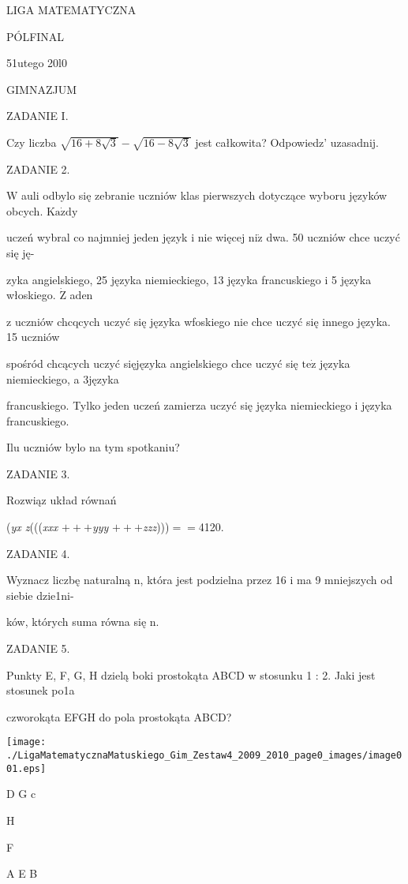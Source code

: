 \documentclass[a4paper,12pt]{article}
\begin{document}
LIGA MATEMATYCZNA

PÓLFINAL

51utego 20l0

GIMNAZJUM

ZADANIE I.

Czy liczba $\sqrt{16+8\sqrt{3}}-\sqrt{16-8\sqrt{3}}$ jest całkowita? Odpowiedz' uzasadnij.

ZADANIE 2.

$\mathrm{W}$ auli odbylo się zebranie uczniów klas pierwszych dotyczące wyboru języków obcych. $\mathrm{K}\mathrm{a}\dot{\mathrm{z}}\mathrm{d}\mathrm{y}$

uczeń wybral co najmniej jeden język i nie więcej $\mathrm{n}\mathrm{i}\dot{\mathrm{z}}$ dwa. 50 uczniów chce uczyć się ję-

zyka angielskiego, 25 języka niemieckiego, 13 języka francuskiego i 5 języka włoskiego. $\dot{\mathrm{Z}}$ aden

z uczniów chcqcych uczyć się języka wfoskiego nie chce uczyć się innego języka. 15 uczniów

spośród chcących uczyć sięjęzyka angielskiego chce uczyć się $\mathrm{t}\mathrm{e}\dot{\mathrm{z}}$ języka niemieckiego, a 3języka

francuskiego. Tylko jeden uczeń zamierza uczyć się języka niemieckiego i języka francuskiego.

Ilu uczniów bylo na tym spotkaniu?

ZADANIE 3.

Rozwiąz układ równań

({\it yx  z}((({\it xxx} $+++${\it yyy} $+++${\it zzz})))$==$4120.

ZADANIE 4.

Wyznacz liczbę naturalną n, która jest podzielna przez 16 i ma 9 mniejszych od siebie dzie1ni-

ków, których suma równa się n.

ZADANIE 5.

Punkty E, F, G, H dzielą boki prostokąta ABCD w stosunku 1 : 2. Jaki jest stosunek po1a

czworokąta EFGH do pola prostokąta ABCD?
\begin{center}
\texttt{[image: ./LigaMatematycznaMatuskiego\_Gim\_Zestaw4\_2009\_2010\_page0\_images/image001.eps]}
\end{center}
D  G  c

H

F

A  E  B
\end{document}
